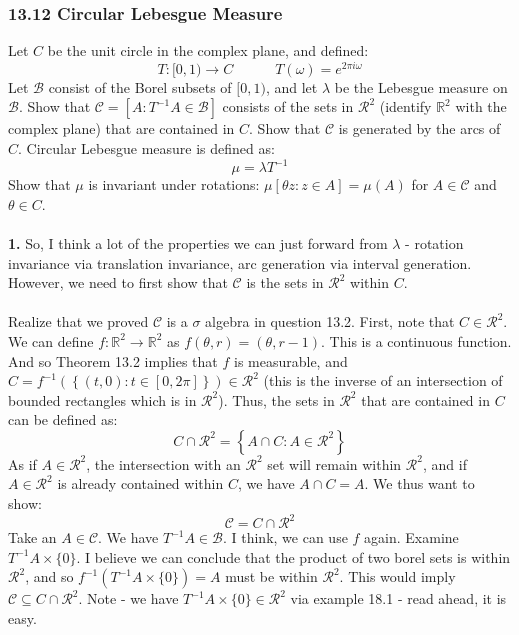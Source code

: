 \documentclass[12pt,a4paper]{article}
\newcommand{\1}[1]{\mathbbm{1}\left\{ #1 \right\}}
\newcommand{\R}{\mathbb{R}}
\newcommand{\ccal}{\mathcal{C}}
\newcommand{\bcal}{\mathcal{B}}
\newcommand{\rcal}{\mathcal{R}}
\begin{document}
\subsubsection{13.12 Circular Lebesgue Measure} Let $C$ be the unit circle in the complex plane, and defined:
$$
	T:[0,1) \to C \quad\quad\quad
	T(\omega) = e^{2\pi i\omega}
$$
Let $\bcal$ consist of the Borel subsets of $[0,1)$, and let $\lambda$ be the Lebesgue measure on $\bcal$. Show that $\ccal = \left[A : T^{-1}A \in \bcal\right]$ consists of the sets in $\rcal^2$ (identify $\R^2$ with the complex plane) that are contained in $C$. Show that $\ccal$ is generated by the arcs of $C$. Circular Lebesgue measure is defined as:
$$
	\mu = \lambda T^{-1}
$$
Show that $\mu$ is invariant under rotations: $\mu[\theta z: z \in A] = \mu(A)$ for $A \in \ccal$ and $\theta \in C$.
\\\\
\textbf{1.} So, I think a lot of the properties we can just forward from $\lambda$ - rotation invariance via translation invariance, arc generation via interval generation. However, we need to first show that $\ccal$ is the sets in $\rcal^2$ within $C$.
\\\\
Realize that we proved $\ccal$ is a $\sigma$ algebra in question 13.2. First, note that $C \in \rcal^2$. We can define $f: \R^2 \to \R^2$ as $f(\theta,r) = (\theta, r-1)$. This is a continuous function. And so Theorem 13.2 implies that $f$ is measurable, and $C = f^{-1}\left(\left\{(t,0) : t \in [0,2\pi]\right\}\right) \in \rcal^2$ (this is the inverse of an intersection of bounded rectangles which is in $\rcal^2$). Thus, the sets in $\rcal^2$ that are contained in $C$ can be defined as:
$$
	C \cap \rcal^2 = \left\{A \cap C : A \in \rcal^2\right\}
$$
As if $A \in \rcal^2$, the intersection with an $\rcal^2$ set will remain within $\rcal^2$, and if $A \in \rcal^2$ is already contained within $C$, we have $A \cap C = A$. We thus want to show:
$$
	\ccal = C \cap \rcal^2
$$
Take an $A \in \ccal$. We have $T^{-1}A \in \bcal$. I think, we can use $f$ again. Examine $T^{-1}A \times \{0\}$. I believe we can conclude that the product of two borel sets is within $\rcal^2$, and so $f^{-1}(T^{-1}A \times \{0\}) = A$ must be within $\rcal^2$. This would imply $\ccal \subseteq C \cap \rcal^2$. Note - we have $T^{-1}A \times \{0\} \in \rcal^2$ via example 18.1 - read ahead, it is easy.
\\\\
\end{document}
